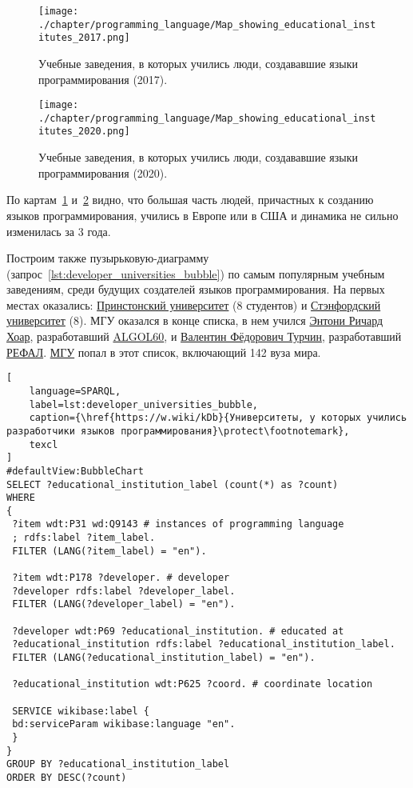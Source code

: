 \begin{figure}[h]
\centering
	\texttt{[image: ./chapter/programming\_language/Map\_showing\_educational\_institutes\_2017.png]}
	\caption{Учебные заведения, в которых учились люди, создававшие языки программирования (2017).}
	\label{fig:universities_2017}
\end{figure}
\begin{figure}[h]
\centering
	\texttt{[image: ./chapter/programming\_language/Map\_showing\_educational\_institutes\_2020.png]}
	\caption{Учебные заведения, в которых учились люди, создававшие языки программирования (2020).}
	\label{fig:universities_2020}
\end{figure}


По картам~\ref{fig:universities_2017} и~\ref{fig:universities_2020} видно, что большая часть людей, причастных к созданию языков программирования, учились в Европе или в США и динамика не сильно изменилась за 3 года.

Построим также пузырьковую-диаграмму (запрос~\ref{lst:developer_universities_bubble}) по самым популярным учебным заведениям, среди будущих создателей языков программирования. На первых местах оказались: \href{https://www.wikidata.org/wiki/Q21578}{Принстонский университет} (8 студентов) и \href{https://www.wikidata.org/wiki/Q41506}{Стэнфордский университет} (8). МГУ оказался в конце списка, в нем учился \href{https://www.wikidata.org/wiki/Q92602}{Энтони Ричард Хоар}, разработавший \href{https://www.wikidata.org/wiki/Q188436}{ALGOL60}, и \href{https://www.wikidata.org/wiki/Q4466506}{Валентин Фёдорович Турчин}, разработавший \href{https://www.wikidata.org/wiki/Q2626418}{РЕФАЛ}. \href{https://www.wikidata.org/wiki/Q13164}{МГУ} попал в этот список, включающий 142 вуза мира.

\begin{lstlisting}[
	language=SPARQL,
	label=lst:developer_universities_bubble,
	caption={\href{https://w.wiki/kDb}{Университеты, у которых учились разработчики языков программирования}\protect\footnotemark},
	texcl
]
#defaultView:BubbleChart
SELECT ?educational_institution_label (count(*) as ?count)
WHERE
{
 ?item wdt:P31 wd:Q9143 # instances of programming language
 ; rdfs:label ?item_label. 
 FILTER (LANG(?item_label) = "en"). 
 
 ?item wdt:P178 ?developer. # developer
 ?developer rdfs:label ?developer_label. 
 FILTER (LANG(?developer_label) = "en"). 
 	
 ?developer wdt:P69 ?educational_institution. # educated at
 ?educational_institution rdfs:label ?educational_institution_label. 
 FILTER (LANG(?educational_institution_label) = "en").
 
 ?educational_institution wdt:P625 ?coord. # coordinate location
 
 SERVICE wikibase:label {
 bd:serviceParam wikibase:language "en".
 } 	
}
GROUP BY ?educational_institution_label
ORDER BY DESC(?count)
\end{lstlisting}

